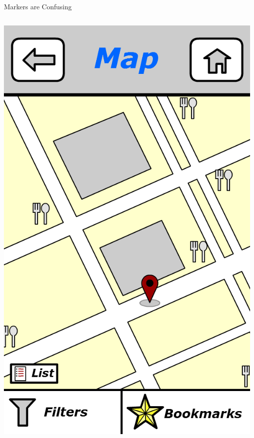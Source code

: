 \documentclass{beamer}
\begin{document}
\begin{frame}{Markers are Confusing}
    \begin{columns}[c]
        \center\includegraphics[height=0.5 \textheight]{digital/map_resturants.png}

\end{columns}
\end{frame}
\end{document}
